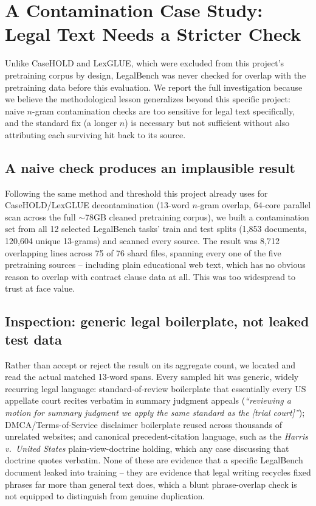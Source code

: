 \documentclass[11pt]{article}
\begin{document}
\section{A Contamination Case Study: Legal Text Needs a Stricter Check}
\label{sec:contamination-method}

Unlike CaseHOLD and LexGLUE, which were excluded from this project's
pretraining corpus by design, LegalBench was never checked for overlap
with the pretraining data before this evaluation. We report the full
investigation because we believe the methodological lesson generalizes
beyond this specific project: naive $n$-gram contamination checks are
too sensitive for legal text specifically, and the standard fix (a
longer $n$) is necessary but not sufficient without also attributing
each surviving hit back to its source.

\subsection{A naive check produces an implausible result}

Following the same method and threshold this project already uses for
CaseHOLD/LexGLUE decontamination (13-word $n$-gram overlap, 64-core
parallel scan across the full $\sim$78GB cleaned pretraining corpus), we
built a contamination set from all 12 selected LegalBench tasks' train
and test splits (1{,}853 documents, 120{,}604 unique 13-grams) and
scanned every source. The result was 8{,}712 overlapping lines across 75
of 76 shard files, spanning every one of the five pretraining sources --
including plain educational web text, which has no obvious reason to
overlap with contract clause data at all. This was too widespread to
trust at face value.

\subsection{Inspection: generic legal boilerplate, not leaked test data}

Rather than accept or reject the result on its aggregate count, we
located and read the actual matched 13-word spans. Every sampled hit was
generic, widely recurring legal language: standard-of-review boilerplate
that essentially every US appellate court recites verbatim in summary
judgment appeals (\emph{``reviewing a motion for summary judgment we
apply the same standard as the [trial court]''}); DMCA/Terms-of-Service
disclaimer boilerplate reused across thousands of unrelated websites; and
canonical precedent-citation language, such as the \emph{Harris
v.\ United States} plain-view-doctrine holding, which any case discussing
that doctrine quotes verbatim. None of these are evidence that a specific
LegalBench document leaked into training -- they are evidence that legal
writing recycles fixed phrases far more than general text does, which a
blunt phrase-overlap check is not equipped to distinguish from genuine
duplication.
\end{document}
